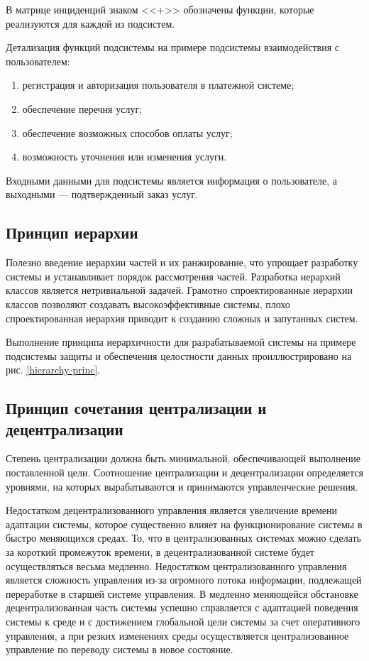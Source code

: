 В матрице инциденций знаком <<+>> обозначены функции, которые реализуются для каждой из подсистем.

Детализация функций подсистемы на примере подсистемы взаимодействия с пользователем:
\begin{enumerate}
  \item регистрация и авторизация пользователя в платежной системе;
  \item обеспечение перечня услуг;
  \item обеспечение возможных способов оплаты услуг;
  \item возможность уточнения или изменения услуги.
\end{enumerate}

Входными данными для подсистемы является информация о пользователе, а выходными --- подтвержденный заказ услуг.

\subsection{Принцип иерархии}

Полезно введение иерархии частей и их ранжирование, что упрощает разработку системы и устанавливает порядок рассмотрения частей.
Разработка иерархий классов является нетривиальной задачей.
Грамотно спроектированные иерархии классов позволяют создавать высокоэффективные системы, плохо спроектированная иерархия приводит к созданию сложных и запутанных систем.

Выполнение принципа иерархичности для разрабатываемой системы на примере подсистемы защиты и обеспечения целостности данных проиллюстрировано на рис. \ref{hierarchy-princ}.

\subsection{Принцип сочетания централизации и децентрализации}

Степень централизации должна быть минимальной, обеспечивающей выполнение поставленной цели.
Соотношение централизации и децентрализации определяется уровнями, на которых вырабатываются и принимаются управленческие решения.

Недостатком децентрализованного управления является увеличение времени адаптации системы, которое существенно влияет на функционирование системы в быстро меняющихся средах.
То, что в централизованных системах можно сделать за короткий промежуток времени, в децентрализованной системе будет осуществляться весьма медленно.
Недостатком централизованного управления является сложность управления из-за огромного потока информации, подлежащей переработке в старшей системе управления.
В медленно меняющейся обстановке децентрализованная часть системы успешно справляется с адаптацией поведения системы к среде и с достижением глобальной цели системы за счет оперативного управления, а при резких изменениях среды осуществляется централизованное управление по переводу системы в новое состояние.

